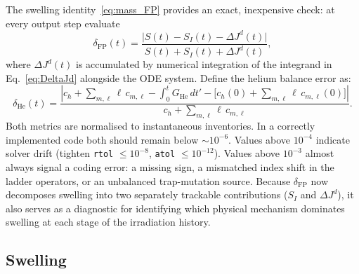 The swelling identity~\eqref{eq:mass_FP} provides an exact, inexpensive
check: at every output step evaluate
\begin{equation}\label{eq:delta_FP}
    \delta_{\mathrm{FP}}(t)
    = \frac{\bigl|S(t) - S_I(t) - \Delta J^d(t)\bigr|}
           {S(t) + S_I(t) + \Delta J^d(t)},
\end{equation}
where $\Delta J^d(t)$ is accumulated by numerical integration of the
integrand in Eq.~\eqref{eq:DeltaJd} alongside the ODE system. Define
the helium balance error as:
\begin{equation}\label{eq:delta_He}
    \delta_{\mathrm{He}}(t)
    = \frac{\displaystyle
       \left|c_h + \sum_{m,\ell}\ell\,c_{m,\ell}
       - \int_0^t G_{\mathrm{He}}\,dt'
       - \bigl[c_h(0) + \sum_{m,\ell}\ell\,c_{m,\ell}(0)\bigr]\right|}
      {\displaystyle c_h + \sum_{m,\ell}\ell\,c_{m,\ell}}.
\end{equation}
Both metrics are normalised to instantaneous inventories. In a correctly
implemented code both should remain below $\sim 10^{-6}$. Values above
$10^{-4}$ indicate solver drift (tighten \texttt{rtol} $\leq 10^{-8}$,
\texttt{atol} $\leq 10^{-12}$). Values above $10^{-3}$ almost always
signal a coding error: a missing sign, a mismatched index shift in the
ladder operators, or an unbalanced trap-mutation source. Because
$\delta_{\mathrm{FP}}$ now decomposes swelling into two separately
trackable contributions ($S_I$ and $\Delta J^d$), it also serves as a
diagnostic for identifying which physical mechanism dominates swelling
at each stage of the irradiation history.


\subsection{Swelling}
\label{sec:swelling}

